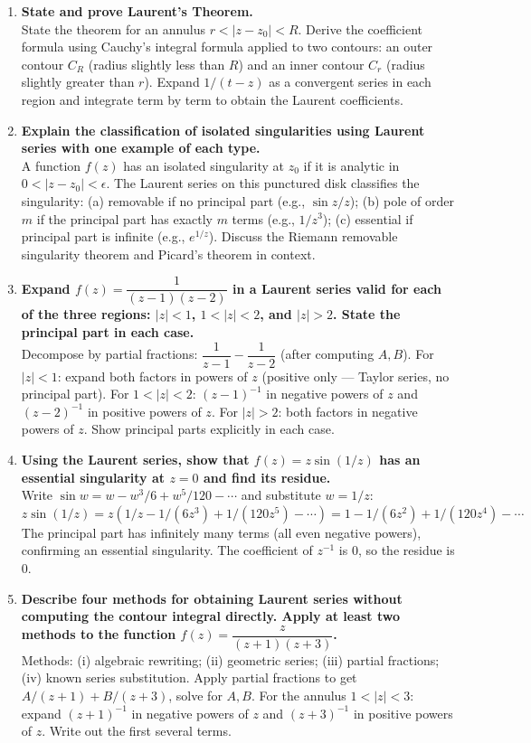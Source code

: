 \documentclass[12pt,a4paper]{article}
\begin{document}
\begin{enumerate}[label=\textbf{D\arabic*.}]

\item \textbf{State and prove Laurent's Theorem.}\\
State the theorem for an annulus $r < |z-z_0| < R$. Derive the coefficient formula
using Cauchy's integral formula applied to two contours: an outer contour $C_R$
(radius slightly less than $R$) and an inner contour $C_r$ (radius slightly greater than $r$).
Expand $1/(t-z)$ as a convergent series in each region and integrate term by term to
obtain the Laurent coefficients.

\item \textbf{Explain the classification of isolated singularities using Laurent series with one example of each type.}\\
A function $f(z)$ has an isolated singularity at $z_0$ if it is analytic in $0 < |z-z_0| < \epsilon$.
The Laurent series on this punctured disk classifies the singularity:
(a) removable if no principal part (e.g., $\sin z / z$);
(b) pole of order $m$ if the principal part has exactly $m$ terms (e.g., $1/z^3$);
(c) essential if principal part is infinite (e.g., $e^{1/z}$).
Discuss the Riemann removable singularity theorem and Picard's theorem in context.

\item \textbf{Expand $f(z) = \dfrac{1}{(z-1)(z-2)}$ in a Laurent series valid for each of the three regions: $|z|<1$, $1<|z|<2$, and $|z|>2$. State the principal part in each case.}\\
Decompose by partial fractions: $\dfrac{1}{z-1}-\dfrac{1}{z-2}$ (after computing $A,B$).
For $|z|<1$: expand both factors in powers of $z$ (positive only --- Taylor series, no principal part).
For $1<|z|<2$: $(z-1)^{-1}$ in negative powers of $z$ and $(z-2)^{-1}$ in positive powers of $z$.
For $|z|>2$: both factors in negative powers of $z$.
Show principal parts explicitly in each case.

\item \textbf{Using the Laurent series, show that $f(z) = z\sin(1/z)$ has an essential singularity at $z=0$ and find its residue.}\\
Write $\sin w = w - w^3/6 + w^5/120 - \cdots$ and substitute $w=1/z$:
$z\sin(1/z) = z(1/z - 1/(6z^3) + 1/(120z^5)-\cdots)
= 1 - 1/(6z^2) + 1/(120z^4) - \cdots$
The principal part has infinitely many terms (all even negative powers), confirming an
essential singularity. The coefficient of $z^{-1}$ is $0$, so the residue is $0$.

\item \textbf{Describe four methods for obtaining Laurent series without computing the contour integral directly. Apply at least two methods to the function $f(z) = \dfrac{z}{(z+1)(z+3)}$.}\\
Methods: (i) algebraic rewriting; (ii) geometric series; (iii) partial fractions; (iv) known series substitution.
Apply partial fractions to get $A/(z+1) + B/(z+3)$, solve for $A,B$.
For the annulus $1<|z|<3$: expand $(z+1)^{-1}$ in negative powers of $z$ and $(z+3)^{-1}$ in positive
powers of $z$. Write out the first several terms.

\end{enumerate}
\end{document}
